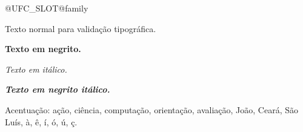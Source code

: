 \documentclass{abntexto-ufc}
\begin{document}
\csname @UFC_SLOT@family\endcsname

Texto normal para validação tipográfica.

\textbf{Texto em negrito.}

\textit{Texto em itálico.}

\textbf{\textit{Texto em negrito itálico.}}

Acentuação: ação, ciência, computação, orientação, avaliação, João, Ceará, São Luís, à, ê, í, ó, ú, ç.
\end{document}
